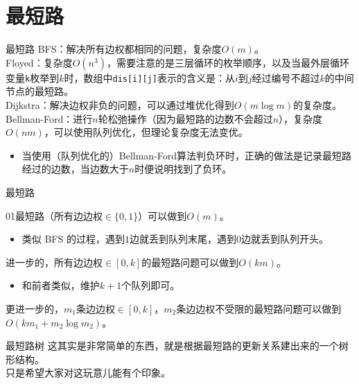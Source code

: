 \documentclass{beamer}
\begin{document}
\section{最短路}
\begin{frame}{最短路}
	BFS：解决所有边权都相同的问题，复杂度$O(m)$。\\
	
	Floyed：复杂度$O(n^3)$，需要注意的是三层循环的枚举顺序，以及当最外层循环变量\texttt{k}枚举到$k$时，数组中\texttt{dis[i][j]}表示的含义是：从$i$到$j$经过编号不超过$k$的中间节点的最短路。\\
	
	Dijkstra：解决边权非负的问题，可以通过堆优化得到$O(m\log m)$的复杂度。\\
	
	Bellman-Ford：进行$n$轮松弛操作（因为最短路的边数不会超过$n$），复杂度$O(nm)$，可以使用队列优化，但理论复杂度无法变优。
	\begin{itemize}
		\item 当使用（队列优化的）Bellman-Ford算法判负环时，正确的做法是记录最短路经过的边数，当边数大于$n$时便说明找到了负环。
	\end{itemize}
\end{frame}
\begin{frame}{最短路}
	
	01最短路（所有边边权$\in \{0,1\}$）可以做到$O(m)$。
	\begin{itemize}
		\item 类似 BFS 的过程，遇到$1$边就丢到队列末尾，遇到$0$边就丢到队列开头。
	\end{itemize}

	进一步的，所有边边权$\in [0,k]$的最短路问题可以做到$O(km)$。
	\begin{itemize}
		\item 和前者类似，维护$k+1$个队列即可。
	\end{itemize}

	更进一步的，$m_1$条边边权$\in [0, k]$，$m_2$条边边权不受限的最短路问题可以做到$O(km_1 + m_2\log m_2)$。	
	
\end{frame}

\begin{frame}{最短路树}
	这其实是非常简单的东西，就是根据最短路的更新关系建出来的一个树形结构。\\
	
	只是希望大家对这玩意儿能有个印象。
\end{frame}
\end{document}
